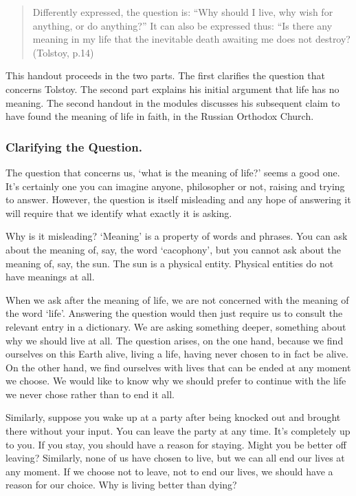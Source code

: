 \documentclass[9pt]{article}
\begin{document}
\begin{quote}
Differently expressed, the question is: ``Why should I live, why wish
for anything, or do anything?'' It can also be expressed thus: ``Is
there any meaning in my life that the inevitable death awaiting me does
not destroy? (Tolstoy, p.14)
\end{quote}

This handout proceeds in the two parts. The first clarifies the question
that concerns Tolstoy. The second part explains his initial argument
that life has no meaning. The second handout in the modules discusses
his subsequent claim to have found the meaning of life in faith, in the
Russian Orthodox Church.

\subsubsection{Clarifying the Question.}\label{clarifying-the-question.}

The question that concerns us, `what is the meaning of life?' seems a
good one. It's certainly one you can imagine anyone, philosopher or not,
raising and trying to answer. However, the question is itself misleading
and any hope of answering it will require that we identify what exactly
it is asking.

Why is it misleading? `Meaning' is a property of words and phrases. You
can ask about the meaning of, say, the word `cacophony', but you cannot
ask about the meaning of, say, the sun. The sun is a physical entity.
Physical entities do not have meanings at all.

When we ask after the meaning of life, we are not concerned with the
meaning of the word `life'. Answering the question would then just
require us to consult the relevant entry in a dictionary. We are asking
something deeper, something about why we should live at all. The
question arises, on the one hand, because we find ourselves on this
Earth alive, living a life, having never chosen to in fact be alive. On
the other hand, we find ourselves with lives that can be ended at any
moment we choose. We would like to know why we should prefer to continue
with the life we never chose rather than to end it all.

Similarly, suppose you wake up at a party after being knocked out and
brought there without your input. You can leave the party at any time.
It's completely up to you. If you stay, you should have a reason for
staying. Might you be better off leaving? Similarly, none of us have
chosen to live, but we can all end our lives at any moment. If we choose
not to leave, not to end our lives, we should have a reason for our
choice. Why is living better than dying?
\end{document}
